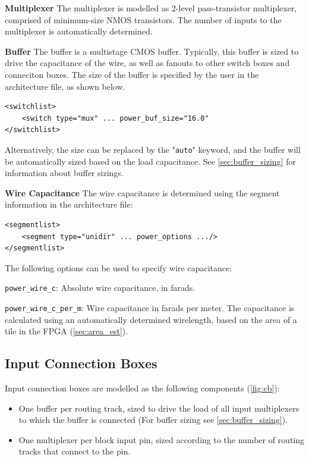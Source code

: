 \documentclass[letterpaper,twoside,10pt]{article}
\begin{document}
\textbf{Multiplexer} 
	The multiplexer is modelled as 2-level pass-transistor multiplexer, comprised of minimum-size NMOS transistors.  
	The number of inputs to the multiplexer is automatically determined.
	
\textbf{Buffer} 
The buffer is a multistage CMOS buffer.  
Typically, this buffer is sized to drive the capacitance of the wire, as well as fanouts to other switch boxes and conneciton boxes.  The size of the buffer is specified by the user in the architecture file, as shown below. 

\begin{BVerbatim}[bgcolor=LightGray, boxwidth=\textwidth] 
<switchlist>
	<switch type="mux" ... power_buf_size="16.0"
</switchlist>
\end{BVerbatim}


Alternatively, the size can be replaced by the "\texttt{auto}" keyword, and the buffer will be automatically sized based on the load capacitance.  See \autoref{sec:buffer_sizing} for information about buffer sizings. 

\textbf{Wire Capacitance} The wire capacitance is determined using the segment information in the architecture file:

\begin{BVerbatim}[bgcolor=LightGray, boxwidth=\textwidth] 
<segmentlist>
	<segment type="unidir" ... power_options .../>
</segmentlist>
\end{BVerbatim}

The following options can be used to specify wire capacitance:
\vspace{-10pt}
\begin{itemize*}
\item \texttt{power\_wire\_c}: Absolute wire capacitance, in farads.
\item \texttt{power\_wire\_c\_per\_m}: Wire capacitance in farads per meter.  The capacitance is calculated using an automatically determined wirelength, based on the area of a tile in the FPGA (\autoref{sec:area_est}).
\end{itemize*}

\subsection{Input Connection Boxes} \label{sec:cb}
Input connection boxes are modelled as the following components (\autoref{fig:cb}):
\vspace{-10pt}
\begin{itemize}
\item One buffer per routing track, sized to drive the load of all input multiplexers to which the buffer is connected (For buffer sizing see \autoref{sec:buffer_sizing}).
\item One multiplexer per block input pin, sized according to the number of routing tracks that connect to the pin.
\end{itemize}
\end{document}
